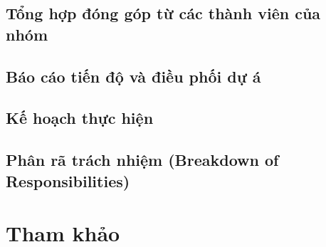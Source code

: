 \documentclass[a4paper, 12pt]{article}
\begin{document}
	\subsection{Tổng hợp đóng góp từ các thành viên của nhóm}
	
	\subsection{Báo cáo tiến độ và điều phối dự á}
	
	\subsection{Kế hoạch thực hiện}
	
	\subsection{Phân rã trách nhiệm (Breakdown of Responsibilities)}
	
	\clearpage
	
	\section{Tham khảo}
	\clearpage
	
\end{document}
